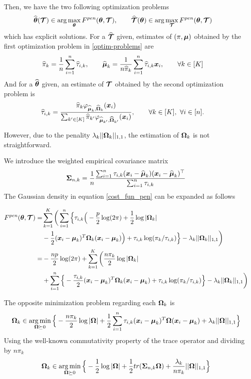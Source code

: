 Then, we have the two following optimization problems
\begin{align}
\label{optim-problems}
\widehat{{\boldsymbol\theta}}(\boldsymbol{\mathcal T})&\in \arg\max_{{\boldsymbol\theta}} F^{pen}({\boldsymbol\theta},\boldsymbol{\mathcal T}),\qquad \widehat{\boldsymbol{\mathcal T}}({\boldsymbol\theta})\in \arg\max_{\boldsymbol{\mathcal T}} F^{pen}({\boldsymbol\theta},\boldsymbol{\mathcal T})
\end{align}
which has explicit solutions. For a $\widehat{\boldsymbol{\mathcal T}}$ given, estimates of $(\pi,\boldsymbol\mu)$ obtained by the first optimization problem in \ref{optim-problems} are
\begin{align}
\label{em-sols}
\widehat\pi_k     &= \frac1n\sum_{i=1}^n \widehat\tau_{i,k},\qquad\widehat{\boldsymbol\mu}_k = \frac1{n\widehat\pi_k}\sum_{i=1}^n \widehat\tau_{i,k}\boldsymbol x_i ,\qquad \forall k\in[K]
\end{align}
And for a $\widehat{{\boldsymbol\theta}}$ given, an estimate of $\boldsymbol{\mathcal T}$ obtained by the second optimization problem is
\begin{align}
\label{em-sols-tau}
\widehat\tau_{i,k}&= \frac{\widehat\pi_k\varphi_{\widehat{\boldsymbol\mu}_k,\widehat{\boldsymbol\Omega}_k}(\boldsymbol x_i)}{\sum_{k'\in[K]}\widehat\pi_{k'}\varphi_{\widehat{\boldsymbol\mu}_{k'},\widehat{\boldsymbol\Omega}_{k'}}(\boldsymbol x_i)},\qquad\forall k\in[K],\ \forall i\in[n].
\end{align}

However, due to the penality $\lambda_k||\boldsymbol\Omega_k||_{1,1}$, the estimation of $\boldsymbol\Omega_k$ is not straightforward.

We introduce the weighted empirical covariance matrix
\begin{equation}
\boldsymbol\Sigma_{n,k} = \frac{1}{n}\frac{\sum_{i=1}^n\tau_{i,k}(\boldsymbol x_i-\widehat{\boldsymbol\mu}_k)(\boldsymbol x_i-\widehat{\boldsymbol\mu}_k)^\top}{\sum_{i=1}^n\tau_{i,k}}
\end{equation}
The Gaussian density in equation \eqref{cost_fun_pen} can be expanded as follows


\begin{align*}
\label{cost_fun_pen_2}
F^{pen}({\boldsymbol\theta},\boldsymbol{\mathcal T})  =& \sum_{k=1}^K \bigg( \sum_{i=1}^{n}\Big\{ \tau_{i,k} \Big(
-\frac{p}{2}\log(2\pi)+\frac{1}{2}\log|\boldsymbol\Omega_k|\\
&-\frac{1}{2}(\boldsymbol x_i-\boldsymbol\mu_k)^T\boldsymbol\Omega_k(\boldsymbol x_i-\boldsymbol\mu_k) \Big)+\tau_{i,k} \log(\pi_k/\tau_{i,k})\Big\} -\lambda_k||\boldsymbol\Omega_k||_{1,1}\bigg)\\
=& -\frac{np}{2}\log(2\pi)+\sum_{k=1}^K \bigg(\frac{n\pi_k}{2}\log|\boldsymbol\Omega_k|\\
&+\sum_{i=1}^{n}\Big\{ -\frac{\tau_{i,k}}{2}(\boldsymbol x_i-\boldsymbol\mu_k)^T\boldsymbol\Omega_k(\boldsymbol x_i-\boldsymbol\mu_k)+\tau_{i,k} \log(\pi_k/\tau_{i,k})\Big\} -\lambda_k||\boldsymbol\Omega_k||_{1,1}\bigg) 
\end{align*}

The opposite minimization problem regarding each $\boldsymbol\Omega_k$ is
\begin{equation}
\boldsymbol\Omega_k \in \operatorname*{arg\,min}_{ \boldsymbol\Omega\succeq 0}\Big\{-\frac{n\pi_k}{2}\log|\boldsymbol\Omega|+\frac{1}{2}\sum_{i=1}^{n}\tau_{i,k}(\boldsymbol x_i-\boldsymbol\mu_k)^T\boldsymbol\Omega(\boldsymbol x_i-\boldsymbol\mu_k)+\lambda_k||\boldsymbol\Omega||_{1,1}\Big\}
\end{equation}
Using the well-known commutativity property of the trace operator and dividing by $n\pi_k$
\begin{equation}
\boldsymbol\Omega_k \in \operatorname*{arg\,min}_{ \boldsymbol\Omega\succeq 0} \Big\{ -\frac{1}{2}\log|\boldsymbol\Omega| +\frac{1}{2} tr(\boldsymbol\Sigma_{n,k}\boldsymbol\Omega)+\frac{\lambda_k}{n\pi_k}||\boldsymbol\Omega||_{1,1}\Big\}
\end{equation}

